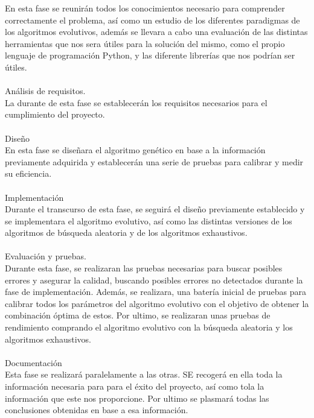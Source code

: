 \documentclass[a4paper, 12pt]{book}
\begin{document}
En esta fase se reunirán todos los conocimientos necesario para comprender correctamente el problema, así como un estudio de los diferentes paradigmas de los algoritmos evolutivos, además se llevara a cabo una evaluación de las distintas herramientas que nos sera útiles para la solución del mismo, como el propio lenguaje de programación Python, y las diferente librerías que nos podrían ser útiles.\\
\\
Análisis de requisitos.\\

La durante de esta fase se establecerán los requisitos necesarios para el cumplimiento del proyecto.\\
\\
Diseño\\

En esta fase se diseñara el algoritmo genético en base a la información previamente adquirida y establecerán una serie de pruebas para calibrar y medir su eficiencia.\\
\\

Implementación\\

Durante el transcurso de esta fase, se seguirá el diseño previamente establecido y se implementara el algoritmo evolutivo, así como las distintas versiones de los algoritmos de búsqueda aleatoria y de los algoritmos exhaustivos.\\
\\
Evaluación y pruebas.\\

Durante esta fase, se realizaran las pruebas necesarias para buscar posibles errores y asegurar la calidad, buscando posibles errores no detectados durante la fase de implementación. Además, se realizara, una batería inicial de pruebas para calibrar todos los parámetros del algoritmo evolutivo con el objetivo de obtener la combinación óptima de estos. Por ultimo, se realizaran unas pruebas de rendimiento comprando el algoritmo evolutivo con la búsqueda aleatoria y los algoritmos exhaustivos.\\
\\
Documentación\\

Esta fase se realizará paralelamente a las otras. SE recogerá en ella toda la información necesaria para para el éxito del proyecto, así como tola la información que este nos proporcione. Por ultimo se plasmará todas las conclusiones obtenidas en base a esa información.\\
\end{document}
